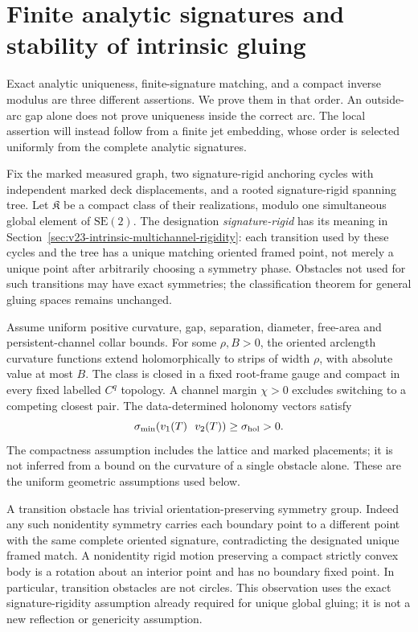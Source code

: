 \section{Finite analytic signatures and stability of intrinsic gluing}
\label{sec:v25-signature-stability}
\label{sec:v24-quantitative-gluing}

Exact analytic uniqueness, finite-signature matching, and a compact inverse
modulus are three different assertions.  We prove them in that order.  An
outside-arc gap alone does not prove uniqueness inside the correct arc.  The
local assertion will instead follow from a finite jet embedding, whose order
is selected uniformly from the complete analytic signatures.

Fix the marked measured graph, two signature-rigid anchoring cycles with
independent marked deck displacements, and a rooted signature-rigid spanning
tree.  Let \(\mathfrak K\) be a compact class of their realizations, modulo
one simultaneous global element of \(\mathrm{SE}(2)\).  The designation
\emph{signature-rigid} has its meaning in
Section~\ref{sec:v23-intrinsic-multichannel-rigidity}: each transition used
by these cycles and the tree has a unique matching oriented framed point,
not merely a unique point after arbitrarily choosing a symmetry phase.
Obstacles not used for such transitions may have exact symmetries; the
classification theorem for general gluing spaces remains unchanged.

Assume uniform positive curvature, gap, separation, diameter, free-area and
persistent-channel collar bounds.  For some \(\rho,B>0\), the oriented
arclength curvature functions extend holomorphically to strips of width
\(\rho\), with absolute value at most \(B\).  The class is closed in a
fixed root-frame gauge and compact in every fixed labelled \(C^q\) topology.
A channel margin \(\chi>0\) excludes switching to a competing closest
pair.  The data-determined holonomy vectors satisfy
\begin{equation}\label{eq:v24-holonomy-margin}
       \sigma_{\min}(v_1(T)\ \ v_2(T))\ge\sigma_{\rm hol}>0.
\end{equation}
The compactness assumption includes the lattice and marked placements; it
is not inferred from a bound on the curvature of a single obstacle alone.
These are the uniform geometric assumptions used below.

A transition obstacle has trivial orientation-preserving symmetry group.
Indeed any such nonidentity symmetry carries each boundary point to a
different point with the same complete oriented signature, contradicting
the designated unique framed match.  A nonidentity rigid motion preserving
a compact strictly convex body is a rotation about an interior point and
has no boundary fixed point.  In particular, transition obstacles are not
circles.  This observation uses the exact signature-rigidity assumption
already required for unique global gluing; it is not a new reflection or
genericity assumption.

